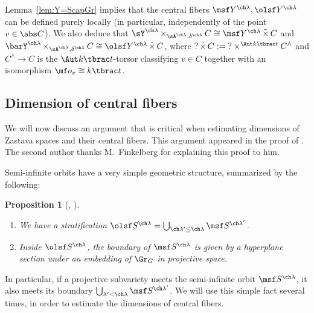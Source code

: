 \documentclass[final]{amsart}
\newtheorem{prop}[subsubsection]{Proposition}
\theoremstyle{remark}
\theoremstyle{definition}
\DeclareMathOperator*{\ttimes}{\tilde\times}
\DeclareMathOperator*{\xt}{\times}
\numberwithin{equation}{section}
\begin{document}
\subsubsection{} \label{sect:YttimesC}
Lemma~\ref{lem:Y=ScapGr} implies that 
the central fibers $\msf Y^{\ch\lambda}, \olsf Y^{\ch\lambda}$ 
can be defined purely locally (in particular, independently of 
the point $v\in \abs C$).
We also deduce that $\sY^{\ch\lambda} \xt_{\sA^{\ch\lambda},\delta^{\ch\lambda}} C 
\cong \msf Y^{\ch\lambda} \ttimes C$ and 
$\barY^{\ch\lambda} \xt_{\sA^{\ch\lambda},\delta^{\ch\lambda}} C \cong \olsf Y^{\ch\lambda} \ttimes C$,
where $? \ttimes C := {?}\times^{\Aut k\tbrac t} C^\wedge $
and $C^\wedge \to C$ is the $\Aut k\tbrac t$-torsor classifying $v\in C$
together with an isomorphism $\mf o_v \cong k\tbrac t$. 


\subsection{Dimension of central fibers}

We will now discuss an argument that is critical when estimating dimensions of Zastava spaces and their central fibers. This argument appeared in the proof 
of \cite[Theorem 3.2]{MV}. The second author thanks M.~Finkelberg for
explaining this proof to him.

Semi-infinite orbits have a very simple geometric structure, summarized by the following:
\begin{prop}[{\cite[Proposition 3.1]{MV}, \cite[Proposition 5.3.6, Corollary 5.3.8]{Xinwen}}]  \label{prop:Shyperplane}
\ 

\begin{enumerate}
\item We have a stratification
$\olsf S^{\ch\lambda} = \bigcup_{\ch\lambda' \le \ch\lambda} \msf S^{\ch\lambda'}$.

\item
Inside $\olsf S^{\ch\lambda}$, the boundary of $\msf S^{\ch\lambda}$
is given by a hyperplane section under an embedding of $\Gr_G$ in projective space. 
\end{enumerate}
\end{prop}



In particular, if a projective subvariety meets the semi-infinite orbit $\msf S^{\ch\lambda}$, it also meets its boundary $\bigcup_{\lambda' < \ch\lambda}  \msf S^{\ch\lambda'}$. We will use this simple fact several times, in order to estimate the dimensions of central fibers.
\end{document}
